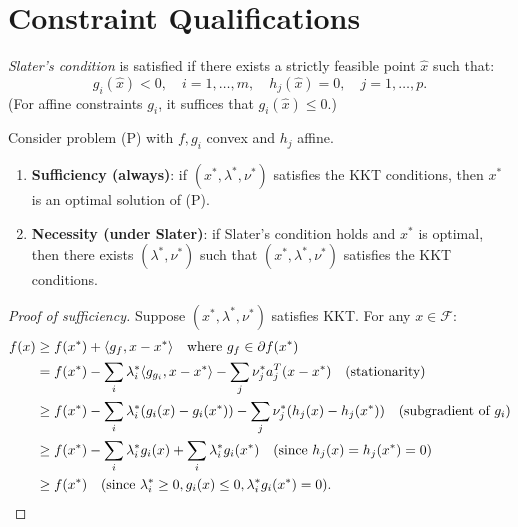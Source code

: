 \section{Constraint Qualifications}

\begin{definition}
\emph{Slater's condition} is satisfied if there exists a strictly feasible point
$\hat{x}$ such that:
\[
    g_i(\hat{x}) < 0, \quad i = 1, \ldots, m, \quad
    h_j(\hat{x}) = 0, \quad j = 1, \ldots, p.
\]
(For affine constraints $g_i$, it suffices that $g_i(\hat{x}) \leq 0$.)
\end{definition}

\begin{theorem}
\label{thm:kkt}
Consider problem (P) with $f, g_i$ convex and $h_j$ affine.
\begin{enumerate}
    \item \textbf{Sufficiency (always)}: if $(x^*, \lambda^*, \nu^*)$ satisfies the
    KKT conditions, then $x^*$ is an optimal solution of (P).
    \item \textbf{Necessity (under Slater)}: if Slater's condition holds and $x^*$
    is optimal, then there exists $(\lambda^*, \nu^*)$ such that
    $(x^*, \lambda^*, \nu^*)$ satisfies the KKT conditions.
\end{enumerate}
\end{theorem}

\begin{proof}[Proof of sufficiency]
Suppose $(x^*, \lambda^*, \nu^*)$ satisfies KKT. For any $x \in \mathcal{F}$:
\begin{align*}
    f(x) &\geq f(x^*) + \langle g_f, x - x^* \rangle
    \quad \text{where } g_f \in \partial f(x^*) \\
    &= f(x^*) - \sum_i \lambda_i^* \langle g_{g_i}, x-x^* \rangle - \sum_j \nu_j^* a_j^T(x-x^*)
    \quad \text{(stationarity)} \\
    &\geq f(x^*) - \sum_i \lambda_i^*(g_i(x) - g_i(x^*)) - \sum_j \nu_j^*(h_j(x) - h_j(x^*))
    \quad \text{(subgradient of } g_i) \\
    &\geq f(x^*) - \sum_i \lambda_i^* g_i(x) + \sum_i \lambda_i^* g_i(x^*)
    \quad \text{(since } h_j(x) = h_j(x^*) = 0) \\
    &\geq f(x^*) \quad \text{(since } \lambda_i^* \geq 0, g_i(x) \leq 0,
    \lambda_i^* g_i(x^*) = 0).
\end{align*}
\end{proof}

